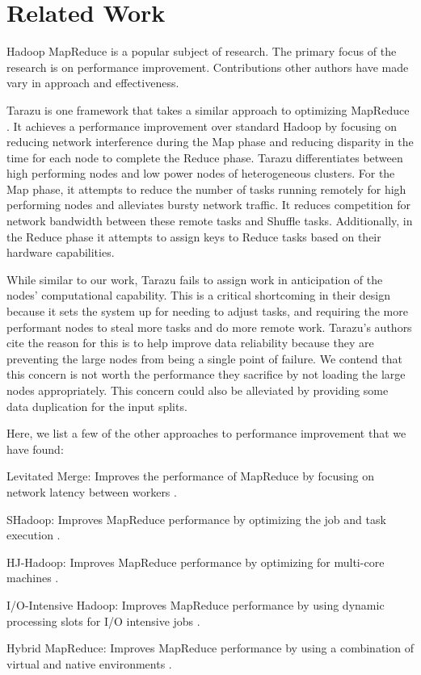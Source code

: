 \section{Related Work}
\label{section:relatedwork}
Hadoop MapReduce is a popular subject of research. The primary focus of the research
is on performance improvement. Contributions other authors have made vary in
approach and effectiveness.

Tarazu is one framework that takes a similar approach to optimizing MapReduce \cite{Tarazu}. 
It achieves a performance improvement over standard Hadoop by focusing on reducing network
interference during the Map phase and reducing disparity in the time for each node to complete
the Reduce phase. Tarazu differentiates between high performing nodes and low power nodes of 
heterogeneous clusters. For the Map phase, it attempts to reduce the number of tasks running 
remotely for high performing nodes and alleviates bursty network traffic. It reduces competition 
for network bandwidth between these remote tasks and Shuffle tasks. Additionally, in the Reduce phase it attempts to
assign keys to Reduce tasks based on their hardware capabilities.

While similar to our work, Tarazu fails to assign work in anticipation of the nodes' computational
capability. This is a critical shortcoming in their design because it sets the system up 
for needing to adjust tasks, and requiring the more performant nodes to steal more tasks 
and do more remote work. Tarazu's authors cite the reason for this is to help improve data 
reliability because they are preventing the large nodes from being a single point of failure. 
We contend that this concern is not worth the performance they sacrifice by not loading the 
large nodes appropriately. This concern could also be alleviated by providing some data duplication
for the input splits.

Here, we list a few of the other approaches to performance improvement that we have found:
\begin{description}
  \item{Levitated Merge:} Improves the performance of MapReduce by focusing on network latency between workers \cite{LevitatedMerge}.
  \item{SHadoop:} Improves MapReduce performance by optimizing the job and task execution \cite{SHadoop}.
  \item{HJ-Hadoop:} Improves MapReduce performance by optimizing for multi-core machines \cite{HJHadoop}.
  \item{I/O-Intensive Hadoop:} Improves MapReduce performance by using dynamic processing slots for I/O intensive jobs \cite{IOIntensiveHadoop}.
  \item{Hybrid MapReduce:} Improves MapReduce performance by using a combination of virtual and native environments \cite{HybridMR}.
\end{description}
